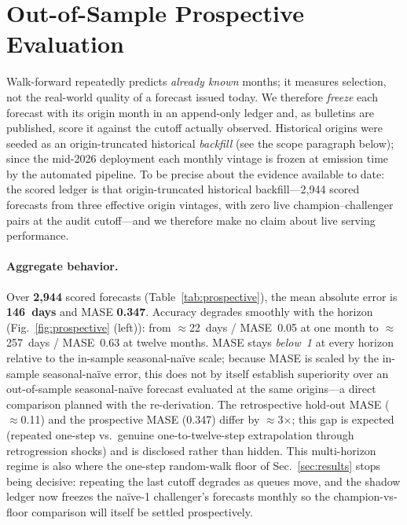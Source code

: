\documentclass[runningheads]{llncs}
\begin{document}
\section{Out-of-Sample Prospective Evaluation}
\label{sec:prospective}

Walk-forward repeatedly predicts \emph{already known} months; it measures
selection, not the real-world quality of a forecast issued today. We therefore
\emph{freeze} each forecast with its origin month in an append-only ledger and,
as bulletins are published, score it against the cutoff actually observed.
Historical origins were seeded as an origin-truncated historical \emph{backfill}
(see the scope paragraph below); since the mid-2026 deployment each monthly vintage
is frozen at emission time by the automated pipeline. To be precise about the
evidence available to date: the scored ledger is that origin-truncated historical
backfill---2{,}944 scored forecasts from three effective origin vintages, with zero
live champion--challenger pairs at the audit cutoff---and we therefore make no claim
about live serving performance.

\paragraph{Aggregate behavior.} Over \textbf{2{,}944} scored
forecasts (Table~\ref{tab:prospective}), the mean absolute error is
\textbf{146~days} and MASE \textbf{0.347}. Accuracy degrades smoothly with the
horizon (Fig.~\ref{fig:prospective} (left)): from $\approx$22~days / MASE~0.05 at one month to
$\approx$257~days / MASE~0.63 at twelve months. MASE stays \emph{below~1} at every
horizon relative to the in-sample seasonal-naïve scale; because MASE is scaled by
the in-sample seasonal-naïve error, this does not by itself establish superiority
over an out-of-sample seasonal-naïve forecast evaluated at the same origins---a
direct comparison planned with the re-derivation. The retrospective hold-out MASE ($\approx$0.11) and the prospective
MASE (0.347) differ by $\approx$3$\times$; this gap is expected (repeated one-step vs.\
genuine one-to-twelve-step extrapolation through retrogression shocks) and is
disclosed rather than hidden. This multi-horizon regime is also where the one-step
random-walk floor of Sec.~\ref{sec:results} stops being decisive: repeating the last
cutoff degrades as queues move, and the shadow ledger now freezes the naïve-1
challenger's forecasts monthly so the champion-vs-floor comparison will itself be
settled prospectively.
\end{document}
